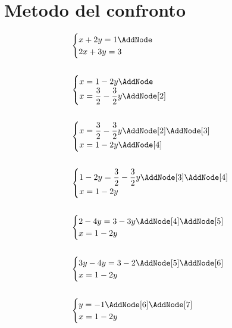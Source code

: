 \section{Metodo del confronto}
\label{sec:metodoconfronto}
\begin{NodesList}[dy=6pt]
	\begin{align*}
		&\begin{cases}
			x+2y=1\AddNode\\
			2x+3y=3\\
		\end{cases}\\
		&\\
		&\begin{cases}
			x=1-2y\AddNode\\
			x=\dfrac{3}{2}-\dfrac{3}{2}y\AddNode[2]\\
		\end{cases}\\
		&\\
		&\begin{cases}
			x=\dfrac{3}{2}-\dfrac{3}{2}y\AddNode[2]\AddNode[3]\\
			x=1-2y\AddNode[4]\\
		\end{cases}\\
		&\\
		&\begin{cases}
			1-2y=\dfrac{3}{2}-\dfrac{3}{2}y\AddNode[3]\AddNode[4]\\
			x=1-2y\\
		\end{cases}\\
		&\\
		&\begin{cases}
			2-4y=3-3y\AddNode[4]\AddNode[5]\\
			x=1-2y\\
		\end{cases}\\
		&\\
		&\begin{cases}
			3y-4y=3-2\AddNode[5]\AddNode[6]\\
			x=1-2y\\
		\end{cases}\\
		&\\
		&\begin{cases}
			y=-1\AddNode[6]\AddNode[7]\\
			x=1-2y\\
		\end{cases}\\

\end{align*}
\end{NodesList}
